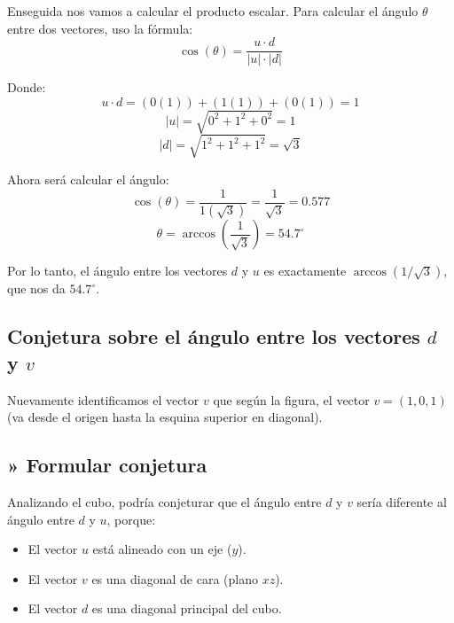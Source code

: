 \documentclass[11pt,letterpaper]{article}
\begin{document}
Enseguida nos vamos a calcular el producto escalar. 
Para calcular el ángulo \( \theta \) entre dos vectores, uso la fórmula:
\begin{equation*}
\cos(\theta) = \frac{u \cdot d}{|u| \cdot |d|}
\end{equation*}

Donde:
\begin{equation*}
u \cdot d = (0 (1)) + (1(1)) + (0(1)) = 1
\end{equation*}
\begin{equation*}
|u| = \sqrt{0^2 + 1^2 + 0^2} = 1
\end{equation*}
\begin{equation*}
|d| = \sqrt{1^2 + 1^2 + 1^2} = \sqrt{3}
\end{equation*}

Ahora será calcular el ángulo:\\
\begin{equation*}
\cos(\theta) = \frac{1}{1 (\sqrt{3})} = \frac{1}{\sqrt{3}} = 0.577
\end{equation*}
\begin{equation*}
\theta = \arccos\left(\frac{1}{\sqrt{3}}\right) = 54.7^\circ
\end{equation*}

Por lo tanto, el ángulo entre los vectores \( d \) y \( u \) es exactamente \( \arccos(1/\sqrt{3}) \), que nos da \( 54.7^\circ \).

\subsection*{Conjetura sobre el ángulo entre los vectores \( d \) y \( v \)}

Nuevamente identificamos el vector \( v \) que
según la figura, el vector \( v = (1,0,1) \) (va desde el origen hasta la esquina superior en diagonal).

\subsection*{» Formular conjetura}
Analizando el cubo, podría conjeturar que el ángulo entre \( d \) y \( v \) sería diferente al ángulo entre \( d \) y \( u \), porque:
\begin{itemize}
    \item El vector \( u \) está alineado con un eje (\( y \)).
    \item El vector \( v \) es una diagonal de cara (plano \( xz \)).
    \item El vector \( d \) es una diagonal principal del cubo.
\end{itemize}
\end{document}
